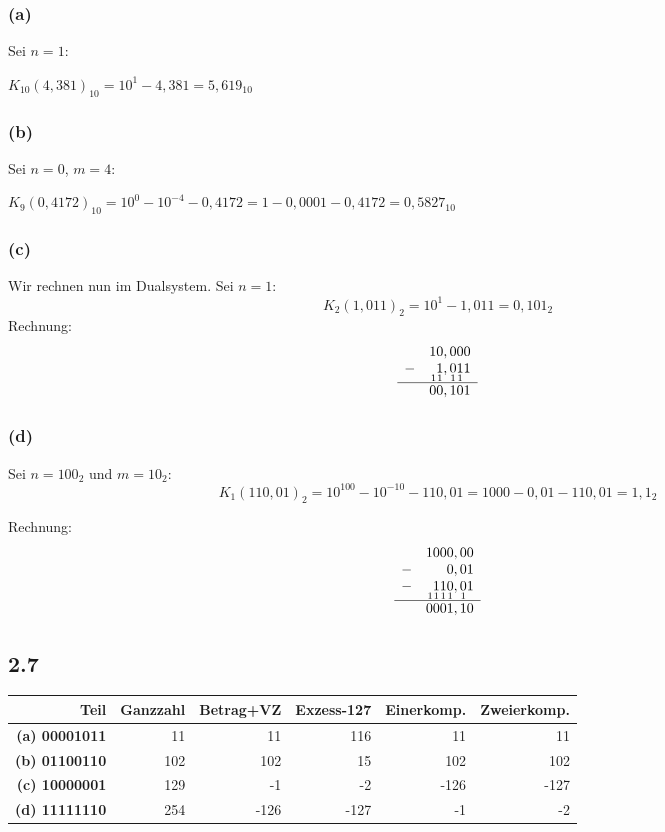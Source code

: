 \documentclass[12pt,a4paper]{article}
\newcommand\T{\rule{0pt}{2.6ex}}
\begin{document}
 \subsubsection*{(a)} Sei $n = 1$:
  
 $K_{10}(4,381)_{10} = 10^1 - 4,381 = 5,619_{10}$
 \subsubsection*{(b)}Sei $n = 0$, $m=4$:
 
 $K_9(0,4172)_{10} = 10^0 - 10^{-4} - 0,4172 = 1 - 0,0001 - 0,4172  = 0,5827_{10}$
 \subsubsection*{(c)}
 Wir rechnen nun im Dualsystem. Sei $n = 1$:
 $$K_2(1,011)_2 = 10^1 - 1,011 = 0,101_2$$
 Rechnung:
 $$
 \begin{array}{r r}
 &10,000\\
 -&\underset{1}{\;}\underset{1}{1},\underset{1}{0}\underset{1}{1}\underset{\;}{1}\\
 \hline
 &00,101 
 \end{array}$$
 \subsubsection*{(d)}Sei $n=100_2$ und $m=10_2$: 
 $$K_1(110,01)_2 = 10^{100} - 10^{-10} - 110,01 = 1000 - 0,01 - 110,01 = 1,1_2$$
 
 Rechnung:
 $$\begin{array}{r r}
 & 1000,00\\
 -&   0,01\\
 -&\underset{1}{\;}\underset{1}{1}\underset{1}{1}\underset{1}{0},\underset{1}{0}1\\
 \hline
 &0001,10
 \end{array}$$
 
 \subsection*{2.7} 
 \begin{center}

 \begin{tabular}{r||r|r|r|r|r}
 Teil & Ganzzahl & Betrag+VZ & Exzess-127 & Einerkomp. & Zweierkomp.\\
 \hline \T
 \textbf{(a) 00001011} &  11 &   11&  116&   11&   11\\
 \textbf{(b) 01100110} & 102 &  102&   15&  102&  102\\
 \textbf{(c) 10000001} & 129 &   -1&   -2& -126& -127\\
 \textbf{(d) 11111110} & 254 & -126& -127&   -1&   -2\\
 \end{tabular}
\end{center}
\end{document}
